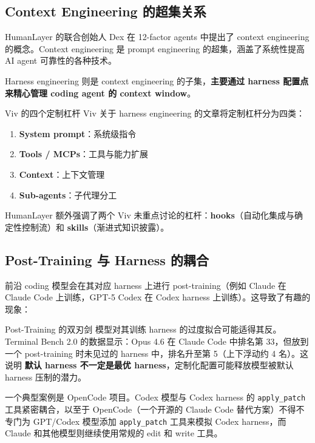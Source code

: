 \documentclass[a4paper]{article}
\begin{document}
\subsection{Context Engineering 的超集关系}

HumanLayer 的联合创始人 Dex 在 12-factor agents 中提出了 context engineering 的概念。Context engineering 是 prompt engineering 的超集，涵盖了系统性提高 AI agent 可靠性的各种技术。

Harness engineering 则是 context engineering 的子集，\textbf{主要通过 harness 配置点来精心管理 coding agent 的 context window}。

\begin{knowledgebox}{Viv 的四个定制杠杆}
Viv 关于 harness engineering 的文章将定制杠杆分为四类：
\begin{enumerate}[leftmargin=1.5em]
    \item \textbf{System prompt}：系统级指令
    \item \textbf{Tools / MCPs}：工具与能力扩展
    \item \textbf{Context}：上下文管理
    \item \textbf{Sub-agents}：子代理分工
\end{enumerate}
HumanLayer 额外强调了两个 Viv 未重点讨论的杠杆：\textbf{hooks}（自动化集成与确定性控制流）和 \textbf{skills}（渐进式知识披露）。
\end{knowledgebox}

\subsection{Post-Training 与 Harness 的耦合}

前沿 coding 模型会在其对应 harness 上进行 post-training（例如 Claude 在 Claude Code 上训练，GPT-5 Codex 在 Codex harness 上训练）。这导致了有趣的现象：

\begin{warningbox}{Post-Training 的双刃剑}
模型对其训练 harness 的过度拟合可能适得其反。Terminal Bench 2.0 的数据显示：Opus 4.6 在 Claude Code 中排名第 33，但放到一个 post-training 时未见过的 harness 中，排名升至第 5（上下浮动约 4 名）。这说明 \textbf{默认 harness 不一定是最优 harness}，定制化配置可能释放模型被默认 harness 压制的潜力。
\end{warningbox}

一个典型案例是 OpenCode 项目。Codex 模型与 Codex harness 的 \texttt{apply\_patch} 工具紧密耦合，以至于 OpenCode（一个开源的 Claude Code 替代方案）不得不专门为 GPT/Codex 模型添加 \texttt{apply\_patch} 工具来模拟 Codex harness，而 Claude 和其他模型则继续使用常规的 edit 和 write 工具。
\end{document}
